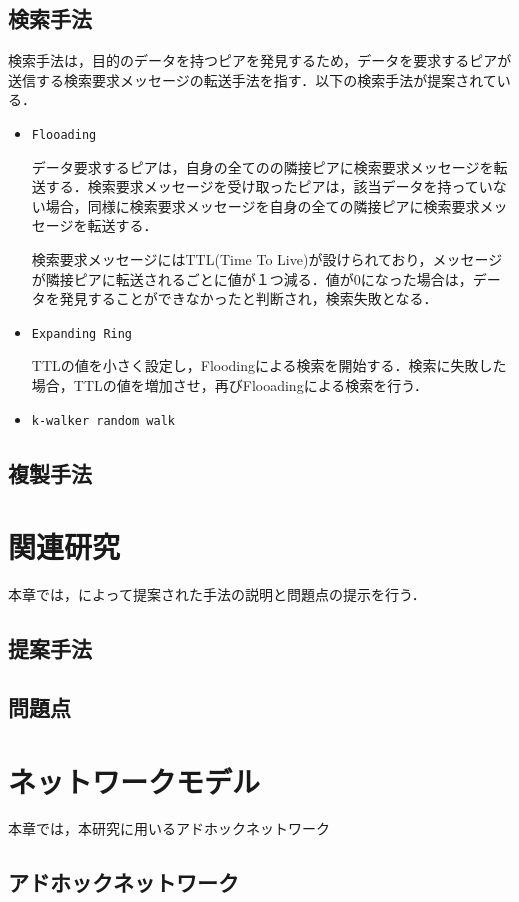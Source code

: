 \documentclass[11pt]{jreport}
\begin{document}
\section{検索手法}
検索手法は，目的のデータを持つピアを発見するため，データを要求するピアが送信する検索要求メッセージの転送手法を指す．以下の検索手法が提案されている．\cite{qlv}
\begin{itemize}
	\item {\tt Flooading}
	\par データ要求するピアは，自身の全てのの隣接ピアに検索要求メッセージを転送する．検索要求メッセージを受け取ったピアは，該当データを持っていない場合，同様に検索要求メッセージを自身の全ての隣接ピアに検索要求メッセージを転送する．
	\par 検索要求メッセージにはTTL(Time To Live)が設けられており，メッセージが隣接ピアに転送されるごとに値が１つ減る．値が0になった場合は，データを発見することができなかったと判断され，検索失敗となる．
	
	\item {\tt Expanding Ring}
	\par TTLの値を小さく設定し，Floodingによる検索を開始する．検索に失敗した場合，TTLの値を増加させ，再びFlooadingによる検索を行う．
	\item {\tt k-walker random walk}
\end{itemize}

\section{複製手法}

\chapter{関連研究}
本章では，\cite{kageyama}によって提案された手法の説明と問題点の提示を行う．
\section{提案手法}
\section{問題点}

\chapter{ネットワークモデル}
本章では，本研究に用いるアドホックネットワーク
\section{アドホックネットワーク}
\end{document}
